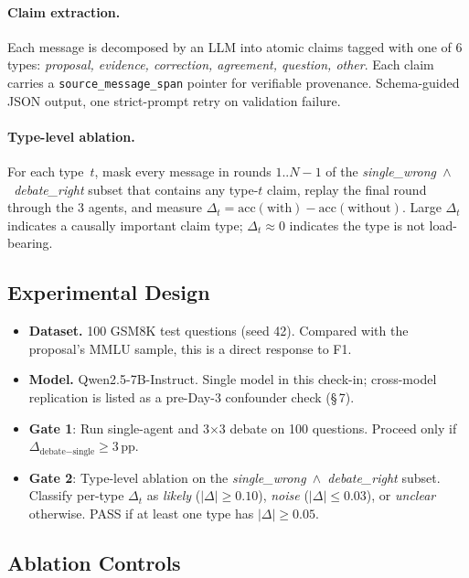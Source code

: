 \begin{itemize}
\paragraph{Claim extraction.} Each message is decomposed by an LLM into atomic claims tagged with one of 6 types: \textit{proposal, evidence, correction, agreement, question, other}. Each claim carries a \texttt{source\_message\_span} pointer for verifiable provenance. Schema-guided JSON output, one strict-prompt retry on validation failure.

\paragraph{Type-level ablation.} For each type~$t$, mask every message in rounds $1..N{-}1$ of the \textit{single\_wrong~$\wedge$~debate\_right} subset that contains any type-$t$ claim, replay the final round through the 3 agents, and measure $\Delta_t=\text{acc}(\text{with})-\text{acc}(\text{without})$. Large $\Delta_t$ indicates a causally important claim type; $\Delta_t \approx 0$ indicates the type is not load-bearing.

\subsection*{Experimental Design}

\begin{itemize}
  \item \textbf{Dataset.} 100 GSM8K test questions (seed 42). Compared with the proposal's MMLU sample, this is a direct response to F1.
  \item \textbf{Model.} Qwen2.5-7B-Instruct. Single model in this check-in; cross-model replication is listed as a pre-Day-3 confounder check (\S\,7).
  \item \textbf{Gate 1}: Run single-agent and 3$\times$3 debate on 100 questions. Proceed only if $\Delta_{\text{debate}-\text{single}} \ge 3\,\text{pp}$.
  \item \textbf{Gate 2}: Type-level ablation on the \textit{single\_wrong~$\wedge$~debate\_right} subset. Classify per-type $\Delta_t$ as \textit{likely} ($|\Delta|\ge 0.10$), \textit{noise} ($|\Delta|\le 0.03$), or \textit{unclear} otherwise. PASS if at least one type has $|\Delta|\ge 0.05$.
\end{itemize}

\subsection*{Ablation Controls}


\end{itemize}

